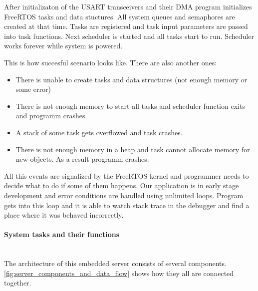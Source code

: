 After initializaton of the USART transceivers and their DMA program initializes 
FreeRTOS tasks and data stuctures. All system queues and semaphores are created
at that time. Tasks are registered and task input parameters are passed into
task functions. Next scheduler is started and all tasks start to run. Scheduler
works forever while system is powered.

This is how succesful scenario looks like. There are also another ones:
\begin{itemize}
  \item There is unable to create tasks and data structures (not enough memory
  or some error)
  \item There is not enough memory to start all tasks and scheduler function
  exits and programm crashes.
  \item A stack of some task gets overflowed and task crashes.
  \item There is not enough memory in a heap and task cannot allocate memory
  for new objects. As a result programm crashes.
\end{itemize}

All this events are signalized by the FreeRTOS kernel and programmer needs to
decide what to do if some of them happens. Our application is in early stage
development and error conditions are handled using unlimited loops.
Program gets into this loop and it is able to watch stack trace in the debugger
and find a place where it was behaved incorrectly.

\paragraph{System tasks and their functions} ~\\

The architecture of this embedded server consists of several components.
\autoref{fig:server_components_and_data_flow} shows how they all are connected
together.


